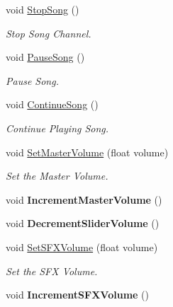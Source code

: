 \begin{DoxyCompactItemize}
void \hyperlink{classAudioManager_a51bdb4c55fa5bf1f538c281fe8a16fad}{Stop\+Song} ()
\begin{DoxyCompactList}\small\item\em Stop Song Channel. \end{DoxyCompactList}\item 
\mbox{\label{classAudioManager_a9df0bd203bd954ebb927656d4acbff16}} 
void \hyperlink{classAudioManager_a9df0bd203bd954ebb927656d4acbff16}{Pause\+Song} ()
\begin{DoxyCompactList}\small\item\em Pause Song. \end{DoxyCompactList}\item 
\mbox{\label{classAudioManager_ad97f762b267c2fb4e6aeb7e6df2e857d}} 
void \hyperlink{classAudioManager_ad97f762b267c2fb4e6aeb7e6df2e857d}{Continue\+Song} ()
\begin{DoxyCompactList}\small\item\em Continue Playing Song. \end{DoxyCompactList}\item 
void \hyperlink{classAudioManager_a10dac004e0e76079f6b9b94cdd4a9469}{Set\+Master\+Volume} (float volume)
\begin{DoxyCompactList}\small\item\em Set the Master Volume. \end{DoxyCompactList}\item 
\mbox{\label{classAudioManager_a99acf81981086c54966746ac1b6cf6a0}} 
void {\bfseries Increment\+Master\+Volume} ()
\item 
\mbox{\label{classAudioManager_a399089557fd7fe5eaa3b1874f668c649}} 
void {\bfseries Decrement\+Slider\+Volume} ()
\item 
void \hyperlink{classAudioManager_a6f9e78a71e1046bf4f13baad2adff4c3}{Set\+S\+F\+X\+Volume} (float volume)
\begin{DoxyCompactList}\small\item\em Set the S\+FX Volume. \end{DoxyCompactList}\item 
\mbox{\label{classAudioManager_aa66b52132b93cdd54978cb150505fa08}} 
void {\bfseries Increment\+S\+F\+X\+Volume} ()
\item 

\end{DoxyCompactItemize}
